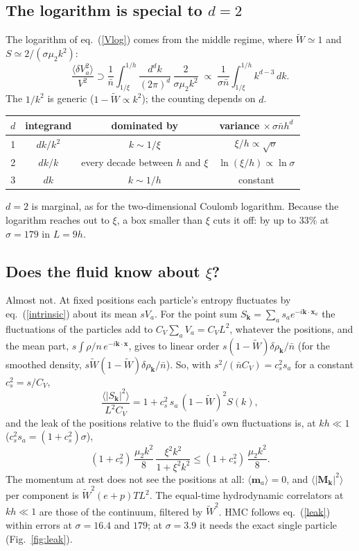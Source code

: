 \documentclass[11pt,aps,preprint,nofootinbib,superscriptaddress,tightenlines]{revtex4-2}
\newcommand{\avg}[1]{\langle #1\rangle}
\def\st{\begin{equation}}
\def\stp{\end{equation}}
\def\Eq#1{eq.~(\ref{#1})}
\def\Fig#1{Fig.~\ref{#1}}
\begin{document}
\subsection{The logarithm is special to $d=2$}

The logarithm of \Eq{Vlog} comes from the middle regime, where $\widetilde W\simeq1$ and $S\simeq2/(\sigma\mu_2k^2)$:
\st
\frac{\avg{\delta V_a^2}}{V^2}\supset\frac1{\bar n}\int_{1/\xi}^{1/h}\frac{d^dk}{(2\pi)^d}\,\frac{2}{\sigma\mu_2k^2}\;\propto\;\frac1{\sigma\bar n}\int_{1/\xi}^{1/h}k^{d-3}\,dk .
\stp
The $1/k^2$ is generic ($1-\widetilde W\propto k^2$); the counting depends on $d$.
\begin{center}
\begin{tabular}{cccc}
\toprule
$d$ & integrand & dominated by & variance $\times\,\sigma\bar nh^d$ \\
\midrule
1 & $dk/k^2$ & $k\sim1/\xi$ & $\xi/h\propto\sqrt\sigma$ \\
2 & $dk/k$ & every decade between $h$ and $\xi$ & $\ln(\xi/h)\propto\ln\sigma$ \\
3 & $dk$ & $k\sim1/h$ & constant \\
\bottomrule
\end{tabular}
\end{center}
$d=2$ is marginal, as for the two-dimensional Coulomb logarithm.  Because the logarithm reaches out to $\xi$, a box smaller than $\xi$ cuts it
off: by up to $33\%$ at $\sigma=179$ in $L=9h$.

\subsection{Does the fluid know about $\xi$?}

Almost not.  At fixed positions each particle's entropy fluctuates by \Eq{intrinsic} about its mean $sV_a$.  For the point sum
$S_{\bm k}=\sum_as_ae^{-i\bm k\cdot\bm x_a}$ the fluctuations of the particles add to $C_V\sum_aV_a=C_VL^2$, whatever the positions, and the mean
part, $s\int\rho/n\,e^{-i\bm k\cdot\bm x}$, gives to linear order $s(1-\widetilde W)\delta\rho_{\bm k}/\bar n$ (for the smoothed density,
$s\widetilde W(1-\widetilde W)\delta\rho_{\bm k}/\bar n$).  So, with $s^2/(\bar nC_V)=c_s^2s_a$ for a constant $c_s^2=s/C_V$,
\st
\frac{\avg{|S_{\bm k}|^2}}{L^2C_V}=1+c_s^2\,s_a\,(1-\widetilde W)^2S(k),
\label{leak}
\stp
and the leak of the positions relative to the fluid's own fluctuations is, at $kh\ll1$ ($c_s^2s_a=(1+c_s^2)\sigma$),
\st
(1+c_s^2)\,\frac{\mu_2k^2}8\,\frac{\xi^2k^2}{1+\xi^2k^2}\le(1+c_s^2)\,\frac{\mu_2k^2}8 .
\stp
The momentum at rest does not see the positions at all: $\avg{\bm m_a}=0$, and $\avg{|\bm M_{\bm k}|^2}$ per component is $\widetilde W^2(e+p)TL^2$.
The equal-time hydrodynamic correlators at $kh\ll1$ are those of the continuum, filtered by $\widetilde W^2$.  HMC follows \Eq{leak} within errors
at $\sigma=16.4$ and $179$; at $\sigma=3.9$ it needs the exact single particle (\Fig{fig:leak}).
\end{document}

